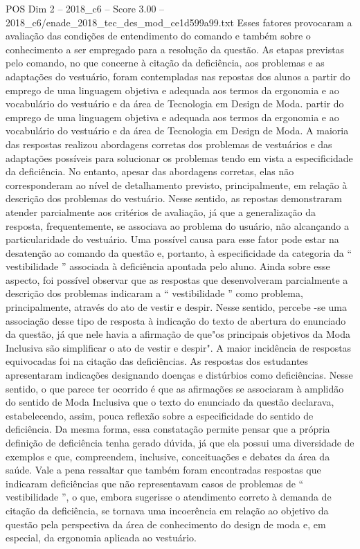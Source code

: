 \begin{textsample}{POS Dim 2 – 2018\_c6 – Score 3.00 – 2018\_c6/enade\_2018\_tec\_des\_mod\_ce1d599a99.txt}
Esses fatores provocaram a avaliação das condições de entendimento do comando e também sobre o conhecimento a ser empregado para a resolução da questão.
As etapas previstas pelo comando, no que concerne à citação da deficiência, aos problemas e as adaptações do vestuário, foram contempladas nas repostas dos alunos a partir do emprego de uma linguagem objetiva e adequada aos termos da ergonomia e ao vocabulário do vestuário e da área de Tecnologia em Design de Moda. partir do emprego de uma linguagem objetiva e adequada aos termos da ergonomia e ao vocabulário do vestuário e da área de Tecnologia em Design de Moda.
A maioria das respostas realizou abordagens corretas dos problemas de vestuários e das adaptações possíveis para solucionar os problemas tendo em vista a especificidade da deficiência.
No entanto, apesar das abordagens corretas, elas não corresponderam ao nível de detalhamento previsto, principalmente, em relação à descrição dos problemas do vestuário.
Nesse sentido, as repostas demonstraram atender parcialmente aos critérios de avaliação, já que a generalização da resposta, frequentemente, se associava ao problema do usuário, não alcançando a particularidade do vestuário.
Uma possível causa para esse fator pode estar na desatenção ao comando da questão e, portanto, à especificidade da categoria da “ vestibilidade ” associada à deficiência apontada pelo aluno.
Ainda sobre esse aspecto, foi possível observar que as respostas que desenvolveram parcialmente a descrição dos problemas indicaram a “ vestibilidade ” como problema, principalmente, através do ato de vestir e despir.
Nesse sentido, percebe -se uma associação desse tipo de resposta à indicação do texto de abertura do enunciado da questão, já que nele havia a afirmação de que"os principais objetivos da Moda Inclusiva são simplificar o ato de vestir e despir".
A maior incidência de respostas equivocadas foi na citação das deficiências.
As respostas dos estudantes apresentaram indicações designando doenças e distúrbios como deficiências.
Nesse sentido, o que parece ter ocorrido é que as afirmações se associaram à amplidão do sentido de Moda Inclusiva que o texto do enunciado da questão declarava, estabelecendo, assim, pouca reflexão sobre a especificidade do sentido de deficiência.
Da mesma forma, essa constatação permite pensar que a própria definição de deficiência tenha gerado dúvida, já que ela possui uma diversidade de exemplos e que, compreendem, inclusive, conceituações e debates da área da saúde.
Vale a pena ressaltar que também foram encontradas respostas que indicaram deficiências que não representavam casos de problemas de “ vestibilidade ”, o que, embora sugerisse o atendimento correto à demanda de citação da deficiência, se tornava uma incoerência em relação ao objetivo da questão pela perspectiva da área de conhecimento do design de moda e, em especial, da ergonomia aplicada ao vestuário.

\end{textsample}
